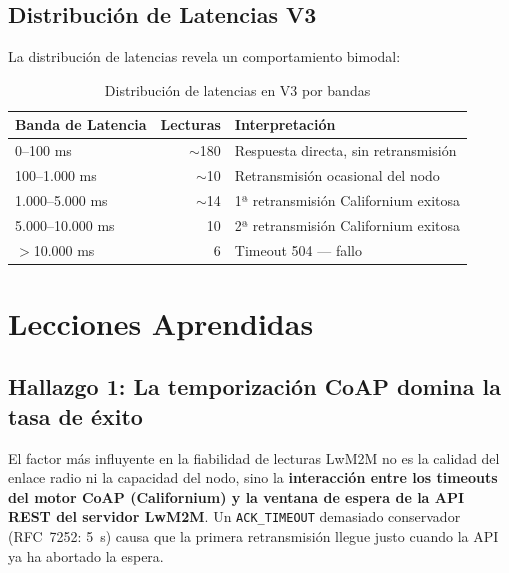 \documentclass[11pt,a4paper]{article}
\begin{document}
\subsection{Distribución de Latencias V3}

La distribución de latencias revela un comportamiento bimodal:

\begin{table}[H]
\centering
\caption{Distribución de latencias en V3 por bandas}
\label{tab:distribucion-v3}
\begin{tabular}{l r l}
\toprule
\textbf{Banda de Latencia} & \textbf{Lecturas} & \textbf{Interpretación} \\
\midrule
0--100 ms & $\sim$180 & Respuesta directa, sin retransmisión \\
100--1.000 ms & $\sim$10 & Retransmisión ocasional del nodo \\
1.000--5.000 ms & $\sim$14 & 1ª retransmisión Californium exitosa \\
5.000--10.000 ms & 10 & 2ª retransmisión Californium exitosa \\
$>$10.000 ms & 6 & \textcolor{fail-red}{Timeout 504 --- fallo} \\
\bottomrule
\end{tabular}
\end{table}

\section{Lecciones Aprendidas}

\subsection{Hallazgo 1: La temporización CoAP domina la tasa de éxito}

El factor más influyente en la fiabilidad de lecturas LwM2M no es la calidad del enlace radio ni la capacidad del nodo, sino la \textbf{interacción entre los timeouts del motor CoAP (Californium) y la ventana de espera de la API REST del servidor LwM2M}. Un \texttt{ACK\_TIMEOUT} demasiado conservador (RFC~7252: \SI{5}{\second}) causa que la primera retransmisión llegue justo cuando la API ya ha abortado la espera.

\begin{center}
\end{center}
\end{document}
